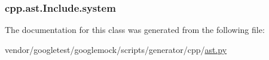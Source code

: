\subsubsection[{\texorpdfstring{system}{system}}]{\setlength{\rightskip}{0pt plus 5cm}cpp.\+ast.\+Include.\+system}\hypertarget{classcpp_1_1ast_1_1Include_a2e8e535b1af7d9b0ff94d0ae9f86e5c5}{}\label{classcpp_1_1ast_1_1Include_a2e8e535b1af7d9b0ff94d0ae9f86e5c5}


The documentation for this class was generated from the following file\+:\begin{DoxyCompactItemize}
\item 
vendor/googletest/googlemock/scripts/generator/cpp/\hyperlink{ast_8py}{ast.\+py}\end{DoxyCompactItemize}
